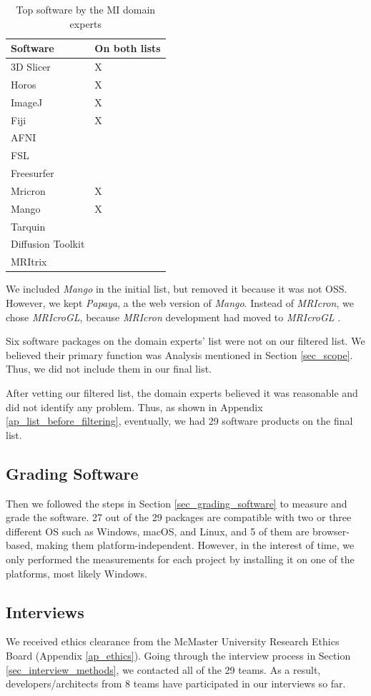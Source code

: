 \begin{table}[H]
\centering
\begin{tabular}{ll}
\hline
Software & On both lists \\ \hline
3D Slicer & X \\
Horos & X \\
ImageJ & X \\
Fiji & X \\
AFNI &  \\
FSL &  \\
Freesurfer &  \\
Mricron & X \\
Mango & X \\
Tarquin &  \\
Diffusion Toolkit &  \\
MRItrix &  \\ \hline
\end{tabular}
\caption{\label{tab_top_software_experts}Top software by the MI domain experts}
\end{table}

We included \textit{Mango} in the initial list, but removed it because it was not OSS. However, we kept \textit{Papaya}, a the web version of \textit{Mango}. Instead of \textit{MRIcron}, we chose \textit{MRIcroGL}, because \textit{MRIcron} development had moved to
\textit{MRIcroGL} \cite{Rorden2021b}.

Six software packages on the domain experts' list were not on our filtered list. We believed their primary function was Analysis mentioned in Section \ref{sec_scope}. Thus, we did not include them in our final list.

After vetting our filtered list, the domain experts believed it was reasonable and did not identify any problem. Thus, as shown in Appendix \ref{ap_list_before_filtering}, eventually, we had 29 software products on the final list. 

\subsection{Grading Software}
Then we followed the steps in Section \ref{sec_grading_software} to measure and grade the software. 27 out of the 29 packages are compatible with two or three different OS such as Windows, macOS, and Linux, and 5 of them are browser-based, making them platform-independent. However, in the interest of time, we only performed the measurements for each project by installing it on one of the platforms, most likely Windows.

\subsection{Interviews}
\label{sec_apply_to_mi_interviews}
We received ethics clearance from the McMaster University Research Ethics Board (Appendix \ref{ap_ethics}). Going through the interview process in Section \ref{sec_interview_methods}, we contacted all of the 29 teams. As a result, developers/architects from 8 teams have participated in our interviews so far.
